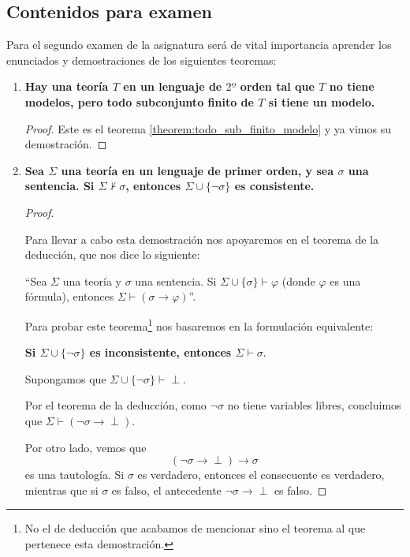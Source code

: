 \subsection{Contenidos para examen}

Para el segundo examen de la asignatura será de vital importancia aprender los enunciados y demostraciones de los siguientes teoremas:


\begin{enumerate}
	\item \textbf{Hay una teoría $T$ en un lenguaje de $2º$ orden tal que $T$ no tiene modelos, pero todo subconjunto finito de $T$ si tiene un modelo.}

\begin{proof}
Este es el teorema \ref{theorem:todo_sub_finito_modelo} y ya vimos su demostración.
\end{proof}

	\item \textbf{Sea $\Sigma$ una teoría en un lenguaje de primer orden, y sea $\sigma$ una sentencia. Si $\Sigma \nvdash \sigma$, entonces $\Sigma\cup \{\neg\sigma\}$ es consistente.}

\begin{proof}
	\begin{mdframed}
	Para llevar a cabo esta demostración nos apoyaremos en el teorema de la deducción, que nos dice lo siguiente:

	``Sea $\Sigma$ una teoría y $\sigma$ una sentencia. Si $\Sigma \cup \{\sigma\}\vdash \varphi$ (donde $\varphi$ es una fórmula), entonces $\Sigma\vdash \left(\sigma \to \varphi\right)$''.
	\end{mdframed}

	Para probar este teorema\footnote{No el de deducción que acabamos de mencionar sino el teorema al que pertenece esta demostración.} nos basaremos en la formulación equivalente:

	\textbf{Si $\Sigma\cup \{\neg\sigma\}$ es inconsistente, entonces $\Sigma\vdash\sigma$}.

	Supongamos que $\Sigma\cup\{\neg\sigma\}\vdash \perp$.

	Por el teorema de la deducción, como $\neg\sigma$ no tiene variables libres, concluimos que $\Sigma\vdash \left(\neg\sigma\to \perp\right)$.

	Por otro lado, vemos que
	\[\left(\neg \sigma \to \perp\right)\to\sigma\]
	es una tautología. Si $\sigma$ es verdadero, entonces el consecuente es verdadero, mientras que si $\sigma$ es falso, el antecedente $\neg\sigma\to\perp$ es falso.


\end{proof}
\end{enumerate}
